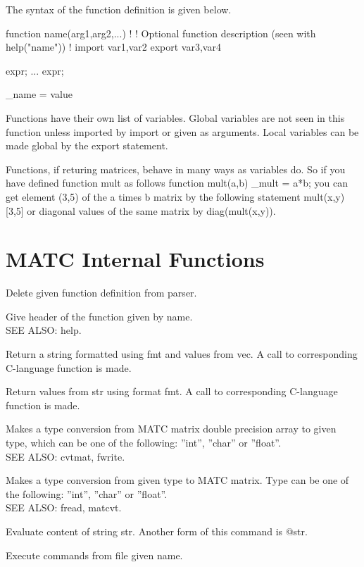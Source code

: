 The syntax of the function definition is given below. 

\ttbegin
function name(arg1,arg2,...)
!
! Optional function description (seen with help("name"))
!
import var1,var2
export var3,var4
{
    expr;
     ...
    expr;

    \_name = value
}
\ttend

Functions have their own list of variables. Global variables are not seen in this 
function unless imported by import or given as arguments. Local variables can be made global by the export statement. 

Functions, if returing matrices, behave in many ways as variables do. So if you have defined function mult as follows 
\ttbegin
function mult(a,b)
{
   _mult = a*b;
}
\ttend
you can get element (3,5) of the a times b matrix by the following statement 
\ttbegin
mult(x,y)[3,5]
\ttend
or diagonal values of the same matrix by 
\ttbegin
diag(mult(x,y)).
\ttend


\section{MATC Internal Functions}

\sifbegin
{}
Delete given function definition from parser. 

Give header of the function given by name. \\
SEE ALSO: help. 

Return a string formatted using fmt and values from vec. A call to corresponding C-language function is made. 

Return values from str using format fmt. A call to corresponding C-language function is made. 

Makes a type conversion from MATC matrix double precision array to given type, 
which can be one of the following: ''int'', ''char'' or ''float''. \\
SEE ALSO: cvtmat, fwrite. 

Makes a type conversion from given type to MATC matrix. Type can be one of the following: ''int'', ''char'' or ''float''. \\
SEE ALSO: fread, matcvt. 

Evaluate content of string str. Another form of this command is @str. 

Execute commands from file given name. 

